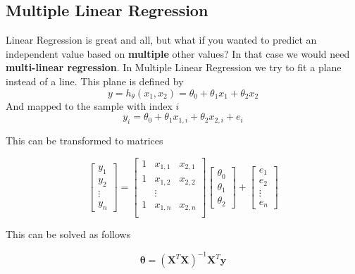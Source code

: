 \documentclass[11pt]{article}
\begin{document}
\subsection{Multiple Linear Regression}

Linear Regression is great and all, but what if you wanted to predict an independent value based on \textbf{multiple} other values? In that case we would need \textbf{multi-linear regression}.
\noindent
In Multiple Linear Regression we try to fit a plane instead of a line. This plane is defined by
\begin{equation}
    y = h_\theta(x_1,x_2) = \theta_0 + \theta_1 x_1 + \theta_2 x_2
\end{equation}
And mapped to the sample with index $i$
\begin{equation*}
    y_i = \theta_0 + \theta_1 x_{1,i} + \theta_2 x_{2,i} + e_i
\end{equation*}

\noindent
This can be transformed to matrices

\begin{equation*}
    \begin{bmatrix}
        y_1    \\
        y_2    \\
        \vdots \\
        y_n
    \end{bmatrix}
    =
    \begin{bmatrix}
        1 & x_{1,1} & x_{2,1} \\
        1 & x_{1,2} & x_{2,2} \\
          & \vdots  &         \\
        1 & x_{1,n} & x_{2,n} \\
    \end{bmatrix}
    \begin{bmatrix}
        \theta_0 \\
        \theta_1 \\
        \theta_2
    \end{bmatrix}
    +
    \begin{bmatrix}
        e_1    \\
        e_2    \\
        \vdots \\
        e_n
    \end{bmatrix}
\end{equation*}

\noindent 
This can be solved as follows

\begin{equation*}
    \bm{\theta} = (\bm{X}^T\bm{X})^{-1}\bm{X}^T\bm{y}
\end{equation*}
\end{document}
